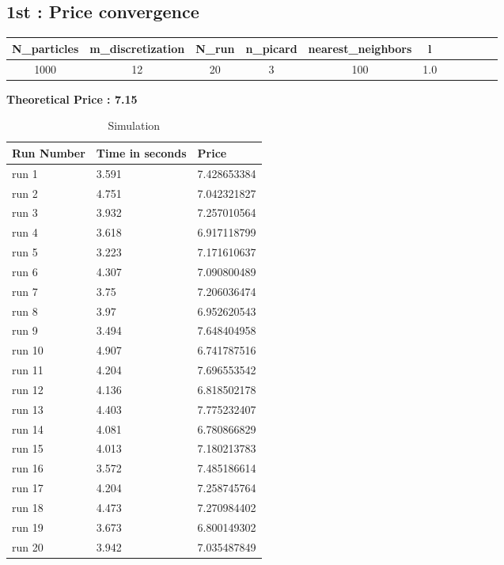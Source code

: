 \documentclass[english,11pt,openany]{article}
\theoremstyle{definition}
\begin{document}
\begin{titlepage}
\subsection{1st : Price convergence}
\begin{tabular}{c|c|c|c|c|c|c|c|c|c|c}
	N\_particles & m\_discretization  & N\_run & n\_picard & nearest\_neighbors & l \\
	\hline
	1000  & 12  & 20  & 3 & 100 & 1.0
\end{tabular}

\vspace{1cm}

\textbf{Theoretical Price : 7.15}


\begin{table}[]
		\centering
		\caption{Simulation}
		\vspace{1cm}
		\begin{tabular}{lll}
			Run Number & Time in seconds &  Price \\
			\hline
			run 1	&	3.591 &	7.428653384 \\
			run 2	&	4.751&	7.042321827\\
			run 3	&	3.932&	7.257010564\\
			run 4	&	3.618&	6.917118799\\
			run 5	&	3.223&	7.171610637\\
			run 6	&	4.307&	7.090800489\\
			run 7	&	3.75&	7.206036474\\
			run 8	&	3.97&	6.952620543\\
			run 9	&	3.494&	7.648404958\\
			run 10	&	4.907&	6.741787516\\
			run 11	&	4.204&	7.696553542\\
			run 12	&	4.136&	6.818502178\\
			run 13	&	4.403&	7.775232407\\
			run 14	&	4.081&	6.780866829\\
			run 15	&	4.013&	7.180213783\\
			run 16	&	3.572&	7.485186614\\
			run 17	&	4.204&	7.258745764\\
			run 18&		4.473&	7.270984402\\
			run 19	&	3.673&	6.800149302\\
			run 20	&	3.942&	7.035487849\\
		
		\end{tabular}
		

\end{table}
\end{titlepage}
\end{document}
